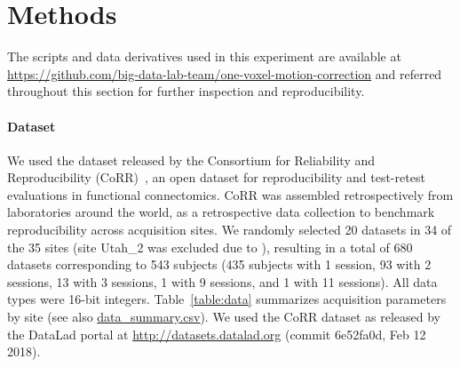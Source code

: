 \documentclass[11pt]{IEEEtran}
\begin{document}
 




\newpage

\section{Methods}

The scripts and data derivatives used in this experiment are available at
\url{https://github.com/big-data-lab-team/one-voxel-motion-correction} and
referred throughout this section for further inspection and
reproducibility.

\paragraph{Dataset}
We used the dataset released by the Consortium for Reliability and
Reproducibility (CoRR)~\cite{zuo2014open}, an open dataset for
reproducibility and test-retest evaluations in functional connectomics.
CoRR was assembled retrospectively from laboratories around the world, as a
retrospective data collection to benchmark reproducibility across
acquisition sites. We randomly selected 20 datasets in 34 of the 35 sites
(site Utah\_2 was excluded due to ), resulting in a total of 680
datasets corresponding to 543 subjects (435 subjects with 1 session, 93
with 2 sessions, 13 with 3 sessions, 1 with 9 sessions, and 1 with 11
sessions). All data types were 16-bit integers. Table~\ref{table:data}
summarizes acquisition parameters by site (see also
\href{https://github.com/big-data-lab-team/one-voxel-motion-correction/data\_summary.csv}{data\_summary.csv}).
We used the CoRR dataset as released by the DataLad portal at
\url{http://datasets.datalad.org} (commit 6e52fa0d, Feb 12 2018).
\end{document}
